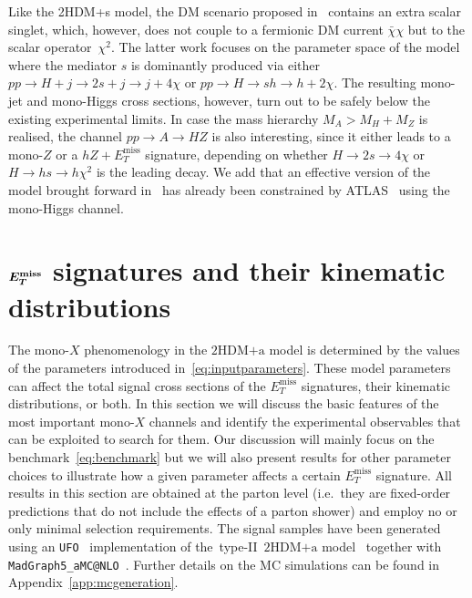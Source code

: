 \documentclass[a4paper, 11pt,notoc]{article}
\newcommand{\MET}{\ensuremath{E_T^\mathrm{miss}}\xspace}
\newcommand{\hdma}{\ensuremath{\textrm{2HDM+a}}\xspace}
\def\bm#1{\mbox{\boldmath$#1$\unboldmath}}
\begin{document}
 Like the 2HDM+s model, the DM scenario proposed in~\cite{vonBuddenbrock:2016rmr} contains an extra scalar singlet, which, however, does not couple to a fermionic DM current $\bar \chi \chi$ but to the scalar operator~$\chi^2$. The latter work focuses on the parameter space of the model where the mediator $s$ is dominantly produced via either  $pp \to H + j \to 2s + j \to j + 4 \chi$ or $pp \to H \to sh \to h + 2\chi$. The resulting mono-jet and mono-Higgs cross sections, however, turn out to be safely below the existing experimental limits. In case the mass hierarchy  $M_A > M_H + M_Z$ is realised, the channel $pp \to A \to HZ$ is also interesting, since it either leads to a mono-$Z$ or a $hZ+\MET$ signature, depending on whether $H \to 2 s \to 4 \chi$ or $H \to h s \to h \chi^2$ is the leading decay. We add that an effective version of the model brought forward in~\cite{vonBuddenbrock:2016rmr}  has already been constrained by ATLAS~\cite{Aaboud:2017uak} using the mono-Higgs channel.  


\section{$\bm{E_T^{\rm miss}}$ signatures and their kinematic distributions}
\label{sec:experimentbasics}

The mono-$X$ phenomenology in the  \hdma model is determined by the values of the parameters introduced in~\eqref{eq:inputparameters}. These model parameters can affect the total signal cross sections of the $\MET$ signatures, their kinematic distributions, or both. In this section we will discuss the basic features of the most important mono-$X$ channels and identify the experimental observables that can be exploited to search for them. Our discussion will  mainly focus on the benchmark~\eqref{eq:benchmark} but we will also present results for other parameter choices to illustrate how a given parameter affects a certain $\MET$ signature.  All results in this section are obtained at the parton level (i.e.~they are fixed-order predictions that do not include the effects of a parton shower) and employ no or only minimal selection requirements. The signal samples have been generated using an {\tt UFO}~\cite{Degrande:2011ua} implementation of the~type-II~\hdma model~\cite{hdmaUFO} together with {\tt MadGraph5\_aMC@NLO}~\cite{Alwall:2014hca}. Further details on the MC simulations can be found in Appendix~\ref{app:mcgeneration}.
\end{document}
